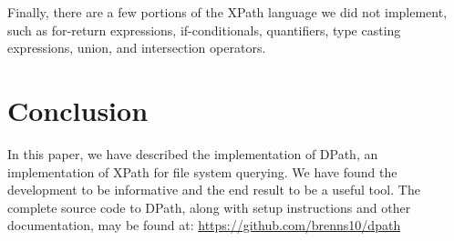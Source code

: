 \documentclass{article}
\begin{document}
Finally, there are a few portions of the XPath language we did not implement,
such as for-return expressions, if-conditionals, quantifiers, type casting
expressions, union, and intersection operators.

\section{Conclusion}

In this paper, we have described the implementation of DPath, an implementation
of XPath for file system querying. We have found the development to be
informative and the end result to be a useful tool. The complete source code to
DPath, along with setup instructions and other documentation, may be found at:
\url{https://github.com/brenns10/dpath}



\end{document}
